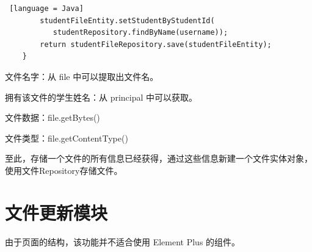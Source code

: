 \begin{enumerate}
\begin{itemize}
\begin{lstlisting} [language = Java]
        studentFileEntity.setStudentByStudentId(
           studentRepository.findByName(username));
        return studentFileRepository.save(studentFileEntity);
    }
        \end{lstlisting}
                文件名字：从 file 中可以提取出文件名。

                拥有该文件的学生姓名：从 principal 中可以获取。

                文件数据：file.getBytes()

                文件类型：file.getContentType()

                至此，存储一个文件的所有信息已经获得，通过这些信息新建一个文件实体对象，使用文件Repository存储文件。
        \end{itemize}
\end{enumerate}

\section{文件更新模块}

由于页面的结构，该功能并不适合使用 Element Plus 的组件。

